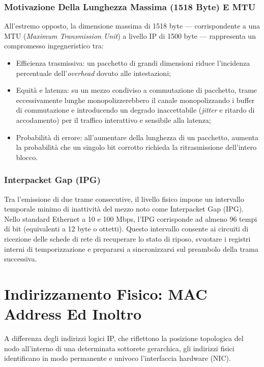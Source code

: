\documentclass[11pt, a4paper]{article}
\begin{document}
\subsubsection{Motivazione Della Lunghezza Massima (1518 Byte) E MTU}
All'estremo opposto, la dimensione massima di 1518 byte — corrispondente a una MTU (\emph{Maximum Transmission Unit}) a livello IP di 1500 byte — rappresenta un compromesso ingegneristico tra:
\begin{itemize}
    \item Efficienza trasmissiva: un pacchetto di grandi dimensioni riduce l'incidenza percentuale dell'\emph{overhead} dovuto alle intestazioni;
    \item Equità e latenza: su un mezzo condiviso a commutazione di pacchetto, trame eccessivamente lunghe monopolizzerebbero il canale monopolizzando i buffer di commutazione e introducendo un degrado inaccettabile (\emph{jitter} e ritardo di accodamento) per il traffico interattivo e sensibile alla latenza;
    \item Probabilità di errore: all'aumentare della lunghezza di un pacchetto, aumenta la probabilità che un singolo bit corrotto richieda la ritrasmissione dell'intero blocco.
\end{itemize}

\subsubsection{Interpacket Gap (IPG)}
Tra l'emissione di due trame consecutive, il livello fisico impone un intervallo temporale minimo di inattività del mezzo noto come Interpacket Gap (IPG). Nello standard Ethernet a 10 e 100 Mbps, l'IPG corrisponde ad almeno 96 tempi di bit (equivalenti a 12 byte o ottetti). Questo intervallo consente ai circuiti di ricezione delle schede di rete di recuperare lo stato di riposo, svuotare i registri interni di temporizzazione e prepararsi a sincronizzarsi sul preambolo della trama successiva.

\newpage

\section{Indirizzamento Fisico: MAC Address Ed Inoltro}

A differenza degli indirizzi logici IP, che riflettono la posizione topologica del nodo all'interno di una determinata sottorete gerarchica, gli indirizzi fisici identificano in modo permanente e univoco l'interfaccia hardware (NIC).
\end{document}

